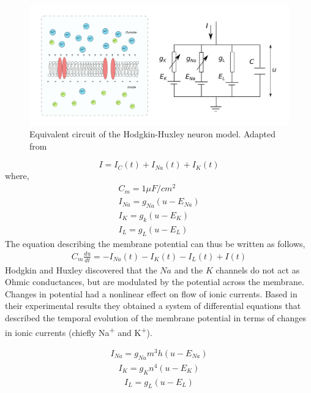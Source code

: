 \documentclass[10pt,letterpaper]{article}
\begin{document}
\begin{figure}[H]
\begin{center}
\includegraphics[scale=0.4]{fig7.pdf} 
\caption{Equivalent circuit of the Hodgkin-Huxley neuron model. Adapted from~\cite{Gerstner2014}}
\label{fig:HH}
\end{center}
\end{figure}

\begin{equation}
I = I_{C}(t) + I_{Na}(t) + I_{K}(t)
\end{equation}
where, 
\begin{eqnarray}
C_m = 1 \mu F/cm^2 \\
I_{Na} = g_{Na}(u-E_{Na})\\
I_{K} = g_{k}(u-E_K)\\
I_{L} = g_{L}(u-E_L)
\end{eqnarray}
The equation describing the membrane potential can thus be written as follows,
\begin{eqnarray}
\label{eq:HH}
C_m\frac{du}{dt}=−I_{Na}(t)−I_{K}(t)−I_{L}(t)+I(t)
\end{eqnarray}
Hodgkin and Huxley discovered that the $Na$ and the $K$ channels do not act as Ohmic conductances, but are modulated by the potential across the membrane. 
Changes in potential had a nonlinear effect on flow of ionic currents. Based in their experimental results they obtained a system of differential equations that described the temporal evolution of the membrane potential in terms of changes in ionic currents (chiefly Na\textsuperscript{+} and K\textsuperscript{+}). 

\begin{eqnarray}\label{d3_2}I_{Na} = g_{Na}m^3h(u−E_{Na})\end{eqnarray}
\begin{eqnarray}\label{d3_3}I_K = g_Kn^4(u−E_K)\end{eqnarray}
\begin{eqnarray}\label{d3_4}I_L = g_L(u−E_L)\end{eqnarray}
\end{document}
